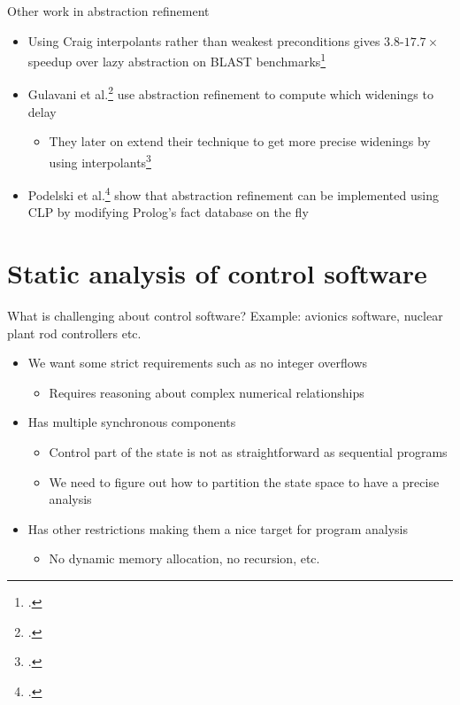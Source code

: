 \documentclass[aspectratio=169]{beamer}
\begin{document}
\begin{frame}{Other work in abstraction refinement}
  \begin{itemize}[<+->]
  \item Using Craig interpolants rather than weakest preconditions gives $3.8$-$17.7\times$ speedup over lazy abstraction on BLAST benchmarks\footcite{mcmillan2006lazy} 
  \item Gulavani et al.\footcite{gulavani2006counterexample} use abstraction refinement to compute which widenings to delay
    \begin{itemize}
    \item They later on extend their technique to get more precise widenings by using interpolants\footcite{gulavani2008automatically}
    \end{itemize}
    \item Podelski et al.\footcite{podelski2007armc} show that abstraction refinement can be implemented using CLP by modifying Prolog's fact database on the fly
  \end{itemize}
\end{frame}

\section{Static analysis of control software}
\begin{frame}{What is challenging about control software?}
  Example: avionics software, nuclear plant rod controllers etc.
  
  \begin{itemize}[<+->]
  \item We want some strict requirements such as no integer overflows
    \begin{itemize}
    \item Requires reasoning about complex numerical relationships
    \end{itemize}
  \item Has multiple synchronous components
    \begin{itemize}
    \item Control part of the state is not as straightforward as sequential programs
    \item We need to figure out how to partition the state space to have a precise analysis
    \end{itemize}
  \item Has other restrictions making them a nice target for program analysis
    \begin{itemize}
    \item No dynamic memory allocation, no recursion, etc.
    \end{itemize}
  \end{itemize}

\end{frame}
\end{document}
